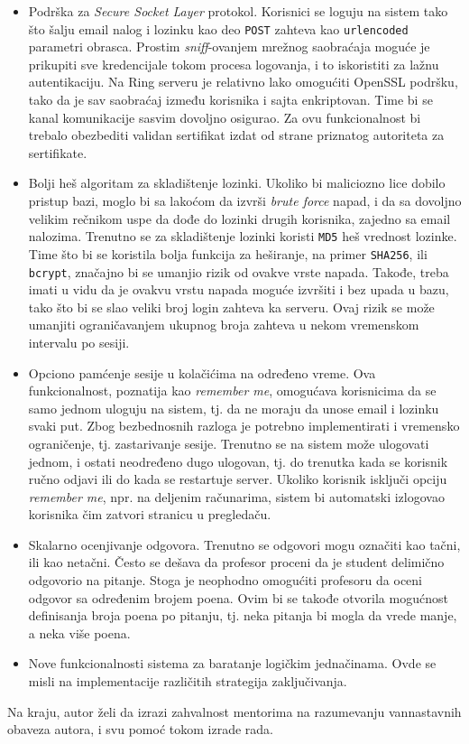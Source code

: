 \begin{itemize}
\item Podrška za \textit{Secure Socket Layer} protokol. Korisnici se loguju na sistem tako što šalju email nalog i lozinku kao deo \texttt{POST} zahteva kao \texttt{urlencoded} parametri obrasca. Prostim \textit{sniff}-ovanjem mrežnog saobraćaja moguće je prikupiti sve kredencijale tokom procesa logovanja, i to iskoristiti za lažnu autentikaciju. Na Ring serveru je relativno lako omogućiti OpenSSL podršku, tako da je sav saobraćaj između korisnika i sajta enkriptovan. Time bi se kanal komunikacije sasvim dovoljno osigurao. Za ovu funkcionalnost bi trebalo obezbediti validan sertifikat izdat od strane priznatog autoriteta za sertifikate.
\item Bolji heš algoritam za skladištenje lozinki. Ukoliko bi maliciozno lice dobilo pristup bazi, moglo bi sa lakoćom da izvrši \textit{brute force} napad, i da sa dovoljno velikim rečnikom uspe da dođe do lozinki drugih korisnika, zajedno sa email nalozima. Trenutno se za skladištenje lozinki koristi \texttt{MD5} heš vrednost lozinke. Time što bi se koristila bolja funkcija za heširanje, na primer \texttt{SHA256}, ili \texttt{bcrypt}, značajno bi se umanjio rizik od ovakve vrste napada. Takođe, treba imati u vidu da je ovakvu vrstu napada moguće izvršiti i bez upada u bazu, tako što bi se slao veliki broj login zahteva ka serveru. Ovaj rizik se može umanjiti ograničavanjem ukupnog broja zahteva u nekom vremenskom intervalu po sesiji.
\item Opciono pamćenje sesije u kolačićima na određeno vreme. Ova funkcionalnost, poznatija kao \textit{remember me}, omogućava korisnicima da se samo jednom uloguju na sistem, tj. da ne moraju da unose email i lozinku svaki put. Zbog bezbednosnih razloga je potrebno implementirati i vremensko ograničenje, tj. zastarivanje sesije. Trenutno se na sistem može ulogovati jednom, i ostati neodređeno dugo ulogovan, tj. do trenutka kada se korisnik ručno odjavi ili do kada se restartuje server. Ukoliko korisnik isključi opciju \textit{remember me}, npr. na deljenim računarima, sistem bi automatski izlogovao korisnika čim zatvori stranicu u pregledaču.
\item Skalarno ocenjivanje odgovora. Trenutno se odgovori mogu označiti kao tačni, ili kao netačni. Često se dešava da profesor proceni da je student delimično odgovorio na pitanje. Stoga je neophodno omogućiti profesoru da oceni odgovor sa određenim brojem poena. Ovim bi se takođe otvorila mogućnost definisanja broja poena po pitanju, tj. neka pitanja bi mogla da vrede manje, a neka više poena.
\item Nove funkcionalnosti sistema za baratanje logičkim jednačinama. Ovde se misli na implementacije različitih strategija zaključivanja.
\end{itemize}

Na kraju, autor želi da izrazi zahvalnost mentorima na razumevanju vannastavnih obaveza autora, i svu pomoć tokom izrade rada.